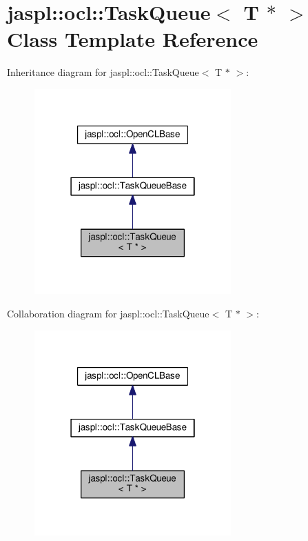 \hypertarget{classjaspl_1_1ocl_1_1_task_queue_3_01_t_01_5_01_4}{}\section{jaspl\+:\+:ocl\+:\+:Task\+Queue$<$ T $\ast$ $>$ Class Template Reference}
\label{classjaspl_1_1ocl_1_1_task_queue_3_01_t_01_5_01_4}


Inheritance diagram for jaspl\+:\+:ocl\+:\+:Task\+Queue$<$ T $\ast$ $>$\+:\nopagebreak
\begin{figure}[H]
\begin{center}
\leavevmode
\includegraphics[width=214pt]{classjaspl_1_1ocl_1_1_task_queue_3_01_t_01_5_01_4__inherit__graph}
\end{center}
\end{figure}


Collaboration diagram for jaspl\+:\+:ocl\+:\+:Task\+Queue$<$ T $\ast$ $>$\+:\nopagebreak
\begin{figure}[H]
\begin{center}
\leavevmode
\includegraphics[width=214pt]{classjaspl_1_1ocl_1_1_task_queue_3_01_t_01_5_01_4__coll__graph}
\end{center}
\end{figure}
